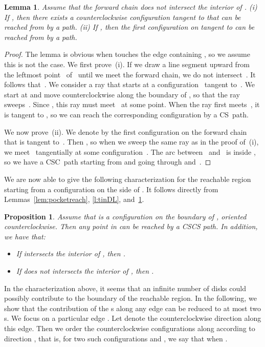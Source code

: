 \documentclass[a4paper]{article}
\newtheorem{lemma}[theorem]{Lemma}
\newtheorem{prop}[theorem]{Proposition}
\begin{document}
\begin{lemma}\label{lem:reachfilling}
Assume that the forward chain  does not intersect the interior of
. (i) If , then there exists 
a counterclockwise configuration tangent to  that can be reached 
from  by a  path. (ii) If , then the first 
configuration on  tangent to  can be reached
from  by a  path.
\end{lemma}
\begin{proof}
  The lemma is obvious when  touches the edge containing , so we
  assume this is not the case.  We first prove~(i). If we draw a line
  segment upward from the leftmost point~ of~ until we meet the
  forward chain, we do not intersect~. It follows
  that~.  We consider a ray that starts at a
  configuration~ tangent to~. We start at
   and move  counterclockwise along the boundary
  of , so that the ray sweeps~. Since , this ray must meet~ at some point.  When the
  ray first meets~, it is tangent to , so we can reach the
  corresponding configuration by a CS~path.

  We now prove~(ii). We denote by  the first
  configuration on the forward chain that is tangent to~. Then , so when we sweep the same ray as in the proof
  of~(i), we meet~ tangentially at some configuration~. The
  arc between~ and~ is inside , so we have a
  CSC~path starting from  and going through 
  and~.
\end{proof}

We are now able to give the following characterization for
the reachable region starting from a configuration on the
side of . It follows directly from Lemmas~\ref{lem:pocketreach},
\ref{l:tinDL}, and~\ref{lem:reachfilling}.
\begin{prop}\label{p:reachside} 
Assume that  is a configuration on the boundary of ,
oriented counterclockwise.
Then any point in  can be reached by a CSCS path.
In addition, we have that:
\begin{itemize}
\item[(i)] If  intersects the interior of ,
  then .
\item[(ii)] If  does not intersects the interior of
  ,  then  . 
\end{itemize}
\end{prop}

In the characterization above, it seems that an infinite number of disks
could possibly contribute to the boundary of the reachable region. In the 
following, we show that the contribution of the s along any edge 
can be reduced to at most two s. We focus
on a particular edge . Let  denote the counterclockwise direction
along this edge. Then we order the counterclockwise configurations along
 according to direction , that is, for two such configurations
 and , we say that 
 when
.
\end{document}
